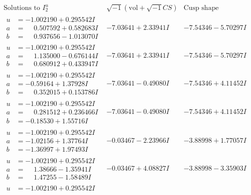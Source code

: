 \documentclass[1p]{elsarticle_modified}
\theoremstyle{definition}
\newcommand{\I}{\sqrt{-1}}
\begin{document}
$$\begin{array}{c|c|c}  
\text{Solutions to }I^u_{2}& \I (\text{vol} + \sqrt{-1}CS) & \text{Cusp shape}\\
 \hline 
\begin{aligned}
u &= -1.002190 + 0.295542 I \\
a &= \phantom{-}0.507592 + 0.582683 I \\
b &= \phantom{-}0.937656 - 1.013070 I\end{aligned}
 & -7.03641 + 2.33941 I & -7.54346 - 5.70297 I \\ \hline\begin{aligned}
u &= -1.002190 + 0.295542 I \\
a &= \phantom{-}1.135000 - 0.676144 I \\
b &= \phantom{-}0.680912 + 0.433947 I\end{aligned}
 & -7.03641 + 2.33941 I & -7.54346 - 5.70297 I \\ \hline\begin{aligned}
u &= -1.002190 + 0.295542 I \\
a &= -0.59164 + 1.37928 I \\
b &= \phantom{-}0.352015 + 0.153786 I\end{aligned}
 & -7.03641 - 0.49080 I & -7.54346 + 4.11452 I \\ \hline\begin{aligned}
u &= -1.002190 + 0.295542 I \\
a &= \phantom{-}0.281512 + 0.236466 I \\
b &= -0.18530 + 1.55716 I\end{aligned}
 & -7.03641 - 0.49080 I & -7.54346 + 4.11452 I \\ \hline\begin{aligned}
u &= -1.002190 + 0.295542 I \\
a &= -1.02156 + 1.37764 I \\
b &= -1.36997 + 1.97493 I\end{aligned}
 & -0.03467 - 2.23966 I & -3.88998 + 1.77057 I \\ \hline\begin{aligned}
u &= -1.002190 + 0.295542 I \\
a &= \phantom{-}1.38666 - 1.35941 I \\
b &= \phantom{-}1.47255 - 1.58489 I\end{aligned}
 & -0.03467 + 4.08827 I & -3.88998 - 3.35903 I \\ \hline\begin{aligned}
u &= -1.002190 + 0.295542 I \\

\end{aligned}
\end{array}$$
\end{document}
